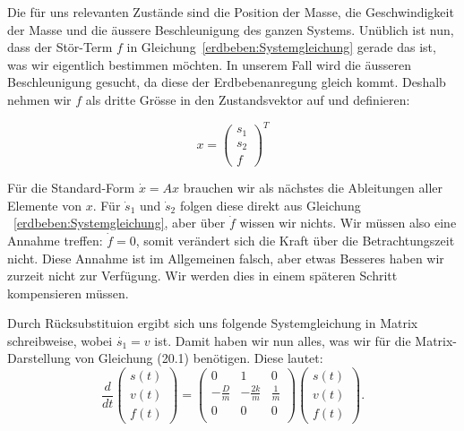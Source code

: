 Die für uns relevanten Zustände sind die Position der Masse, die Geschwindigkeit der Masse und die äussere Beschleunigung des ganzen Systems.
Unüblich ist nun, dass der Stör-Term $f$ in Gleichung~\eqref{erdbeben:Systemgleichung} gerade das ist, was wir eigentlich bestimmen möchten.  
In unserem Fall wird die äusseren Beschleunigung gesucht, da diese der Erdbebenanregung gleich kommt.
Deshalb nehmen wir $f$ als dritte Grösse in den Zustandsvektor auf und definieren:

\[ 
x= \left( \begin{array}{c} {s_1}\\ {s_2}\\{f}\end{array}\right)^T
\] 
  
Für die Standard-Form $\dot x = Ax$ brauchen wir als nächstes die Ableitungen aller Elemente von $x$. Für $\dot s_1$ und $\dot s_2$ folgen diese direkt aus Gleichung  ~\eqref{erdbeben:Systemgleichung}, aber über $\dot f$ wissen wir nichts. 
Wir müssen also eine Annahme treffen: $\dot f = 0$, somit verändert sich die Kraft über die Betrachtungszeit nicht. Diese Annahme ist im Allgemeinen falsch, aber etwas Besseres haben wir zurzeit nicht zur Verfügung. 
Wir werden dies in einem späteren Schritt kompensieren müssen.

Durch Rücksubstituion ergibt sich uns folgende Systemgleichung in Matrix schreibweise, wobei $\dot {s_1}= v$ ist. Damit haben wir nun alles, was wir für die Matrix-Darstellung von Gleichung (20.1) benötigen. Diese lautet:
\begin{equation}
\frac{d}{dt} \left(\begin{array}{c} s(t) \\ v(t) \\ f(t) \end{array}\right) = \left(
 \begin{array}{ccc} 	
0 & 1& 0 \\ 
- \frac{D}{m} &-\frac{2k}{m} & \frac{1} {m}\\
0 & 0 & 0\\
\end{array}\right)  \left(\begin{array}{c} s(t)\\ v(t)\\ f(t) \end{array}\right).
\end{equation}












